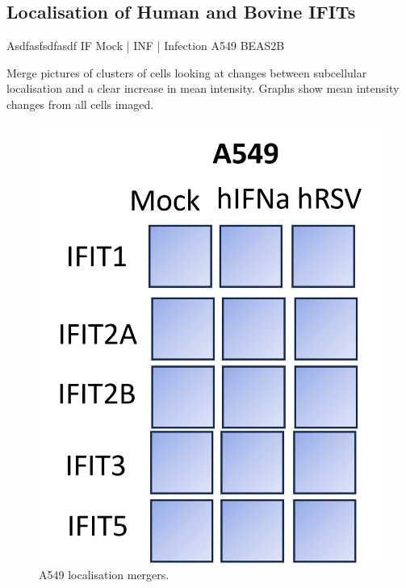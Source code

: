 \subsection{Localisation of Human and Bovine IFITs} \label{Localisation of Human and Bovine IFITs}
Asdfasfsdfasdf \newline
IF Mock | INF | Infection \newline
A549 BEAS2B

Merge pictures of clusters of cells looking at changes between subcellular localisation and a clear increase in mean intensity. Graphs show mean intensity changes from all cells imaged.

\begin{figure}
    \centering
    \includegraphics[width=1\linewidth]{06. Chapter 1/Figs/02. Localisation/01. a549 merges.png}
    \caption[A549 localisation mergers.]{A549 localisation mergers.}
    \label{A549 localisation mergers.}
\end{figure}


